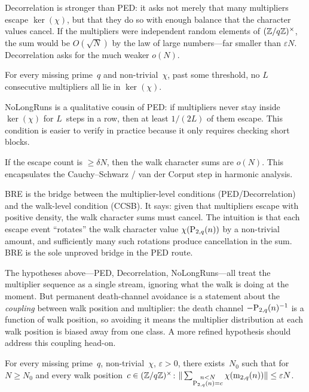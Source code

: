 Decorrelation is stronger than PED: it asks not merely that many
multipliers escape $\ker(\chi)$, but that they do so with enough
balance that the character values cancel.  If the multipliers were
independent random elements of $(\mathbb{Z}/q\mathbb{Z})^\times$, the sum would be
$O(\sqrt{N})$ by the law of large numbers---far smaller than
$\varepsilon N$.  Decorrelation asks for the much weaker $o(N)$.

\begin{property}
For every missing prime~$q$ and non-trivial~$\chi$, past some
threshold, no $L$ consecutive multipliers all lie in $\ker(\chi)$.
\end{property}

NoLongRuns is a qualitative cousin of PED: if multipliers never stay
inside $\ker(\chi)$ for $L$~steps in a row, then at least $1/(2L)$ of
them escape.  This condition is easier to verify in practice because it
only requires checking short blocks.

\begin{property}
If the escape count is $\geq \delta N$, then the walk character sums
are $o(N)$.  This encapsulates the Cauchy--Schwarz / van der Corput
step in harmonic analysis.
\end{property}

BRE is the bridge between the multiplier-level conditions
(PED/Decorrelation) and the walk-level condition (CCSB).  It says:
given that multipliers escape with positive density, the walk
character sums must cancel.  The intuition is that each escape event
``rotates'' the walk character value $\chi(\mathrm{P}_{2,q}(n))$ by a
non-trivial amount, and sufficiently many such rotations produce
cancellation in the sum.  BRE is the sole unproved bridge in the PED
route.

The hypotheses above---PED, Decorrelation, NoLongRuns---all treat
the multiplier sequence as a single stream, ignoring what the walk is
doing at the moment.  But permanent death-channel avoidance is a
statement about the \emph{coupling} between walk position and
multiplier: the death channel $-\mathrm{P}_{2,q}(n)^{-1}$ is a function of
walk position, so avoiding it means the multiplier distribution at
each walk position is biased away from one class.  A more refined
hypothesis should address this coupling head-on.

\begin{property}
\label{def:cme}%
For every missing prime~$q$, non-trivial~$\chi$, $\varepsilon > 0$,
there exists~$N_0$ such that for $N \geq N_0$ and every walk
position~$c \in (\mathbb{Z}/q\mathbb{Z})^\times$:
$\|\sum_{\substack{n < N \\ \mathrm{P}_{2,q}(n) = c}} \chi(\mathrm{m}_{2,q}(n))\|
\leq \varepsilon N$.
\end{property}

